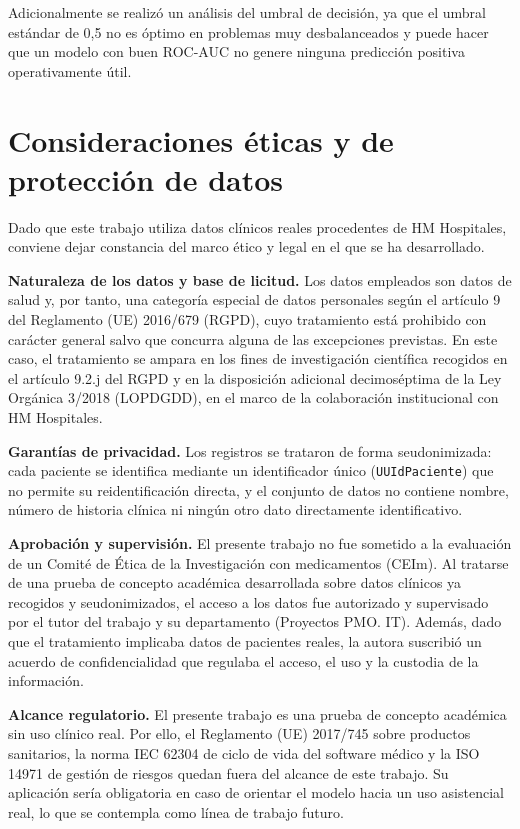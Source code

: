 \documentclass[12pt, a4paper, oneside]{report}
\begin{document}
Adicionalmente se realizó un análisis del umbral de decisión, ya que el umbral estándar de 0,5 no es óptimo en problemas muy desbalanceados y puede hacer que un modelo con buen ROC-AUC no genere ninguna predicción positiva operativamente útil.

\section{Consideraciones éticas y de protección de datos}

Dado que este trabajo utiliza datos clínicos reales procedentes de HM Hospitales, conviene dejar constancia del marco ético y legal en el que se ha desarrollado.

\textbf{Naturaleza de los datos y base de licitud.} Los datos empleados son datos de salud y, por tanto, una categoría especial de datos personales según el artículo 9 del Reglamento (UE) 2016/679 (RGPD), cuyo tratamiento está prohibido con carácter general salvo que concurra alguna de las excepciones previstas. En este caso, el tratamiento se ampara en los fines de investigación científica recogidos en el artículo 9.2.j del RGPD y en la disposición adicional decimoséptima de la Ley Orgánica 3/2018 (LOPDGDD), en el marco de la colaboración institucional con HM Hospitales.

\textbf{Garantías de privacidad.} Los registros se trataron de forma seudonimizada: cada paciente se identifica mediante un identificador único (\texttt{UUIdPaciente}) que no permite su reidentificación directa, y el conjunto de datos no contiene nombre, número de historia clínica ni ningún otro dato directamente identificativo.

\textbf{Aprobación y supervisión.} El presente trabajo no fue sometido a la evaluación de un Comité de Ética de la Investigación con medicamentos (CEIm). Al tratarse de una prueba de concepto académica desarrollada sobre datos clínicos ya recogidos y seudonimizados, el acceso a los datos fue autorizado y supervisado por el tutor del trabajo y su departamento (Proyectos PMO. IT). Además, dado que el tratamiento implicaba datos de pacientes reales, la autora suscribió un acuerdo de confidencialidad que regulaba el acceso, el uso y la custodia de la información.

\textbf{Alcance regulatorio.} El presente trabajo es una prueba de concepto académica sin uso clínico real. Por ello, el Reglamento (UE) 2017/745 sobre productos sanitarios, la norma IEC 62304 de ciclo de vida del software médico y la ISO 14971 de gestión de riesgos quedan fuera del alcance de este trabajo. Su aplicación sería obligatoria en caso de orientar el modelo hacia un uso asistencial real, lo que se contempla como línea de trabajo futuro.
\end{document}

